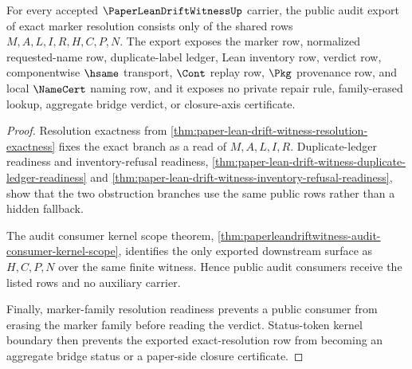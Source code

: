 \begin{theorem}
\label{thm:paper-lean-drift-witness-public-resolution-export}
For every accepted $\PaperLeanDriftWitnessUp$ carrier, the public audit export of exact marker resolution consists only of the shared rows $M,A,L,I,R,H,C,P,N$. The export exposes the marker row, normalized requested-name row, duplicate-label ledger, Lean inventory row, verdict row, componentwise $\hsame$ transport, $\Cont$ replay row, $\Pkg$ provenance row, and local $\NameCert$ naming row, and it exposes no private repair rule, family-erased lookup, aggregate bridge verdict, or closure-axis certificate.
\end{theorem}
\begin{proof}
Resolution exactness from \autoref{thm:paper-lean-drift-witness-resolution-exactness} fixes the exact branch as a read of $M,A,L,I,R$. Duplicate-ledger readiness and inventory-refusal readiness, \autoref{thm:paper-lean-drift-witness-duplicate-ledger-readiness} and \autoref{thm:paper-lean-drift-witness-inventory-refusal-readiness}, show that the two obstruction branches use the same public rows rather than a hidden fallback.

The audit consumer kernel scope theorem, \autoref{thm:paperleandriftwitness-audit-consumer-kernel-scope}, identifies the only exported downstream surface as $H,C,P,N$ over the same finite witness. Hence public audit consumers receive the listed rows and no auxiliary carrier.

Finally, marker-family resolution readiness prevents a public consumer from erasing the marker family before reading the verdict. Status-token kernel boundary then prevents the exported exact-resolution row from becoming an aggregate bridge status or a paper-side closure certificate.
\end{proof}

